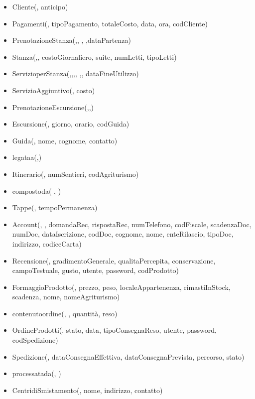 \documentclass[12pt,a4paper]{article}
\begin{document}
\begin{itemize}
\item Cliente(\underline{}, anticipo)
\item Pagamenti(\underline{}, tipoPagamento, totaleCosto, data, ora,  codCliente)
\item PrenotazioneStanza(\underline{},\underline{}, \underline{}, \underline{},dataPartenza)
\item Stanza(\underline{},\underline{}, costoGiornaliero, suite, numLetti, tipoLetti)
\item ServizioperStanza(\underline{},\underline{},\underline{},\underline{}, \underline{},\underline{}, dataFineUtilizzo)
\item ServizioAggiuntivo(\underline{}, costo)
\item PrenotazioneEscursione(\underline{},\underline{},\underline{})
\item Escursione(\underline{}, giorno, orario,  codGuida)
\item Guida(\underline{}, nome, cognome, contatto)
\item legataa(\underline{},\underline{})
\item Itinerario(\underline{}, numSentieri, codAgriturismo)
\item compostoda( \underline{},  \underline{})
\item Tappe(\underline{}, tempoPermanenza) 
\item Account(\underline{}, \underline{}, domandaRec, rispostaRec, numTelefono, codFiscale, scadenzaDoc, numDoc, dataIscrizione, codDoc, cognome, nome, enteRilascio, tipoDoc, indirizzo, codiceCarta)
\item Recensione(\underline{}, gradimentoGenerale, qualitaPercepita, conservazione, campoTestuale, gusto,  utente,  password,  codProdotto)
\item FormaggioProdotto(\underline{}, prezzo, peso, localeAppartenenza, rimastiInStock, scadenza,  nome,  nomeAgriturismo)
\item contenutoordine(\underline{}, \underline{}, quantità, reso)
\item OrdineProdotti(\underline{}, stato, data, tipoConsegnaReso,  utente,  password,  codSpedizione)
\item Spedizione(\underline{}, dataConsegnaEffettiva, dataConsegnaPrevista, percorso, stato)
\item processatada(\underline{}, \underline{})
\item CentridiSmistamento(\underline{}, nome, indirizzo, contatto)

\end{itemize}
\end{document}
